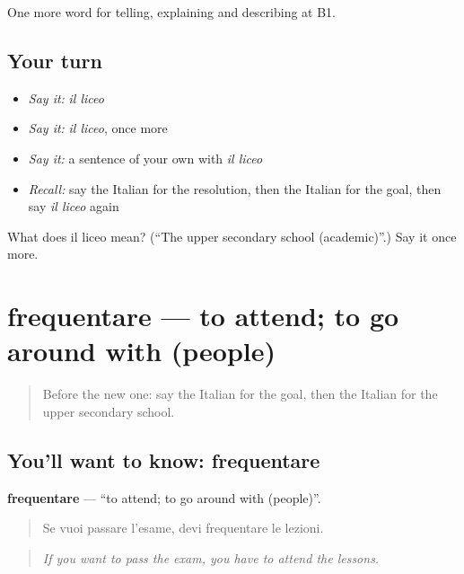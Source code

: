\begin{grammarlens}[title={What you've built}]
One more word for telling, explaining and describing at B1.
\end{grammarlens}

\subsection*{Your turn}
\begin{itemize}
\raggedright
  \item \emph{Say it:} \emph{il liceo}
  \item \emph{Say it:} \emph{il liceo}, once more
  \item \emph{Say it:} a sentence of your own with \emph{il liceo}
  \item \emph{Recall:} say the Italian for the resolution, then the Italian for the goal, then say \emph{il liceo} again
\end{itemize}

\begin{tcolorbox}[breakable,colback=teal!4,colframe=teal!35!black,title={Before you move on}]
What does il liceo mean? (\textquotedblleft{}The upper secondary school (academic)\textquotedblright{}.) Say it once more.
\end{tcolorbox}
\section[frequentare]{frequentare — to attend; to go around with (people)}

\label{lesson:IT-C379-frequentare}



\begin{quote}
Before the new one: say the Italian for the goal, then the Italian for the upper secondary school.
\end{quote}

\subsection*{You'll want to know: frequentare}
\textbf{frequentare} — \textquotedblleft{}to attend; to go around with (people)\textquotedblright{}.

\begin{quote}
Se vuoi passare l'esame, devi frequentare le lezioni.
\end{quote}

\begin{quote}
\emph{If you want to pass the exam, you have to attend the lessons.}
\end{quote}

